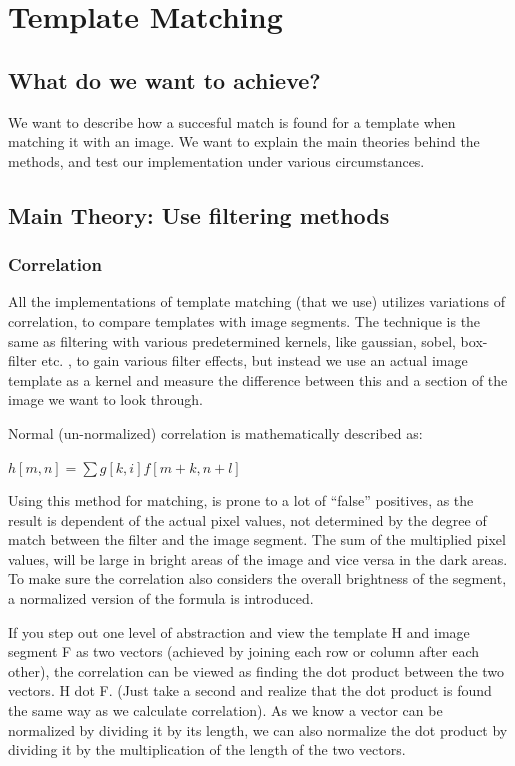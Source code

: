 \section{Template Matching}

\subsection{What do we want to achieve?}

We want to describe how a succesful match is found for a template when
matching it with an image. We want to explain the main theories behind
the methods, and test our implementation under various circumstances.

\subsection{Main Theory: Use filtering methods}

\subsubsection{Correlation}

All the implementations of template matching (that we use) utilizes
variations of correlation, to compare templates with image segments. The
technique is the same as filtering with various predetermined kernels,
like gaussian, sobel, box-filter etc. , to gain various filter effects,
but instead we use an actual image template as a kernel and measure the
difference between this and a section of the image we want to look
through.

Normal (un-normalized) correlation is mathematically described as:

$h[m,n] = \sum{g[k,i] f[m+k,n+l]}$

Using this method for matching, is prone to a lot of ``false''
positives, as the result is dependent of the actual pixel values, not
determined by the degree of match between the filter and the image
segment. The sum of the multiplied pixel values, will be large in bright
areas of the image and vice versa in the dark areas. To make sure the
correlation also considers the overall brightness of the segment, a
normalized version of the formula is introduced.

If you step out one level of abstraction and view the template H and
image segment F as two vectors (achieved by joining each row or column
after each other), the correlation can be viewed as finding the dot
product between the two vectors. H dot F. (Just take a second and
realize that the dot product is found the same way as we calculate
correlation). As we know a vector can be normalized by dividing it by
its length, we can also normalize the dot product by dividing it by the
multiplication of the length of the two vectors.

